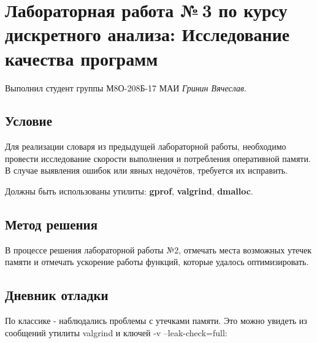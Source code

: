 \documentclass[12pt]{article}
\begin{document}
\section*{Лабораторная работа №\,3 по курсу дискретного анализа: Исследование качества программ}

Выполнил студент группы М8О-208Б-17 МАИ \textit{Гринин Вячеслав}.

\subsection*{Условие}

Для реализации словаря из предыдущей лабораторной работы, необходимо провести исследование скорости выполнения и потребления оперативной памяти.
В случае выявления ошибок или явных недочётов, требуется их исправить.

Должны быть использованы утилиты: \textbf{gprof}, \textbf{valgrind}, \textbf{dmalloc}.


\subsection*{Метод решения}

В процессе решения лабораторной работы №2, отмечать места возможных утечек памяти и отмечать ускорение работы функций, которые удалось оптимизировать.

\subsection*{Дневник отладки}

По классике - наблюдались проблемы с утечками памяти. Это можно увидеть из сообщений утилиты valgrind и ключей -v --leak-check=full:
\end{document}
